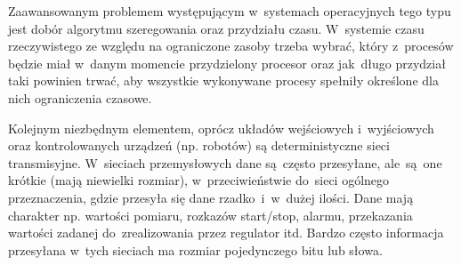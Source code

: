 Zaawansowanym problemem występującym w~systemach operacyjnych tego typu jest dobór algorytmu szeregowania oraz przydziału czasu. W~systemie czasu rzeczywistego ze względu na ograniczone zasoby trzeba wybrać, który z~procesów będzie miał w~danym momencie przydzielony procesor oraz jak~długo przydział taki powinien trwać, aby wszystkie wykonywane procesy spełniły określone dla nich ograniczenia czasowe.


Kolejnym niezbędnym elementem, oprócz układów wejściowych i~wyjściowych oraz kontrolowanych urządzeń (np. robotów) są deterministyczne sieci transmisyjne.
W~sieciach przemysłowych dane są~często przesyłane, ale~są~one krótkie (mają niewielki rozmiar), w~przeciwieństwie do~sieci ogólnego przeznaczenia, gdzie przesyła się dane rzadko~i~w~dużej ilości. Dane mają charakter np. wartości
pomiaru, rozkazów start/stop, alarmu, przekazania wartości zadanej do~zrealizowania przez regulator itd. Bardzo często informacja przesyłana w~tych sieciach ma rozmiar pojedynczego bitu lub słowa.

